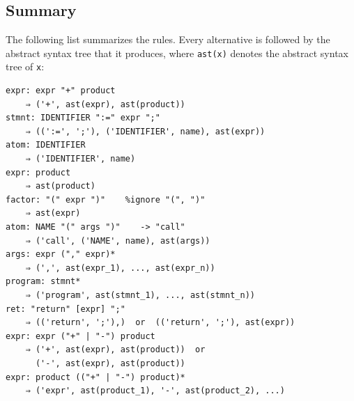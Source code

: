 \documentclass[11pt,a4paper]{article}
\newenvironment{unbreakable}{\par\noindent\begin{minipage}{\linewidth}}{\end{minipage}\par}
\begin{document}
\subsection{Summary}
The following list summarizes the rules.  Every alternative is followed by the abstract syntax tree that it
produces, where \texttt{ast(x)} denotes the abstract syntax tree of \texttt{x}:
\begin{unbreakable}
\begin{verbatim}
expr: expr "+" product
    ⇒ ('+', ast(expr), ast(product))
stmnt: IDENTIFIER ":=" expr ";"
    ⇒ ((':=', ';'), ('IDENTIFIER', name), ast(expr))
atom: IDENTIFIER
    ⇒ ('IDENTIFIER', name)
expr: product
    ⇒ ast(product)
factor: "(" expr ")"    %ignore "(", ")"
    ⇒ ast(expr)
atom: NAME "(" args ")"    -> "call"
    ⇒ ('call', ('NAME', name), ast(args))
args: expr ("," expr)*
    ⇒ (',', ast(expr_1), ..., ast(expr_n))
program: stmnt*
    ⇒ ('program', ast(stmnt_1), ..., ast(stmnt_n))
ret: "return" [expr] ";"
    ⇒ (('return', ';'),)  or  (('return', ';'), ast(expr))
expr: expr ("+" | "-") product
    ⇒ ('+', ast(expr), ast(product))  or
      ('-', ast(expr), ast(product))
expr: product (("+" | "-") product)*
    ⇒ ('expr', ast(product_1), '-', ast(product_2), ...)
\end{verbatim}
\end{unbreakable}
\end{document}
